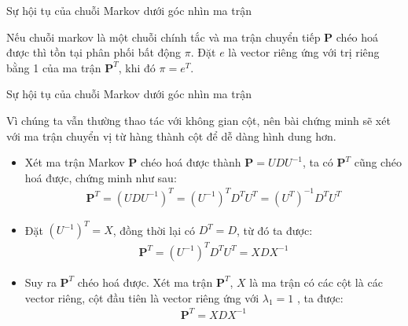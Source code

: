 \begin{frame}{Sự hội tụ của chuỗi Markov dưới góc nhìn ma trận}
\vfill
    \begin{mytheo*}{}
        Nếu chuỗi markov là một chuỗi chính tắc và ma trận chuyển tiếp $\mathbf{P}$ chéo hoá được thì tồn tại phân phối bất động $\pi$. Đặt $e$ là vector riêng ứng với trị riêng bằng 1 của ma trận $\mathbf{P}^T$, khi đó $\pi = e^T$.
    \end{mytheo*}
    \vfill
\end{frame}
\begin{frame}{Sự hội tụ của chuỗi Markov dưới góc nhìn ma trận}
    \begin{myproof*}{}
        Vì chúng ta vẫn thường thao tác với không gian cột, nên bài chứng minh sẽ xét với ma trận chuyển vị từ hàng thành cột để dễ dàng hình dung hơn.
    \begin{itemize}
        \item[\bullet] Xét ma trận Markov $\mathbf{P}$ chéo hoá được thành $\mathbf{P} = U D U^{-1}$, ta có $\mathbf{P}^T$ cũng chéo hoá được, chứng minh như sau: 
        \begin{align}
            \mathbf{P}^T = (U D U^{-1})^T = (U^{-1})^T D^T U^T = (U^{T})^{-1} D^T U^T
        \end{align}

        \item[\bullet] Đặt $(U^{-1})^T = X$, đồng thời lại có $D^T = D$, từ đó ta được:
        \begin{align}
            \mathbf{P}^T = (U^{-1})^T D^T U^T = X D X^{-1}
        \end{align}

        \item[\bullet] Suy ra $\mathbf{P}^T$ chéo hoá được. Xét ma trận $\mathbf{P}^T$, $X$ là ma trận có các cột là các vector riêng, cột đầu tiên là vector riêng ứng với $\lambda_1 = 1$ , ta được:
        \begin{align}
            \mathbf{P}^T = X D X^{-1}
        \end{align}
        \end{itemize}
    \end{myproof*}
\end{frame}

